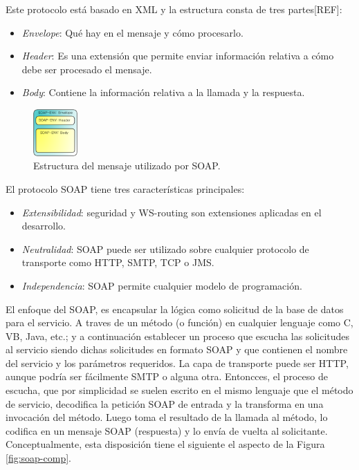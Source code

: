 \documentclass[conference]{IEEEtran}
\begin{document}
Este protocolo está basado en XML y la estructura consta de tres
partes[REF]:
\begin{itemize}
\item\emph{Envelope}: Qué hay en el mensaje y cómo procesarlo.
\item\emph{Header}: Es una extensión que permite enviar información
  relativa a cómo debe ser procesado el mensaje.
\item\emph{Body}: Contiene la información relativa a la llamada y la
  respuesta.
\end{itemize}

\begin{figure}[!t]
\centering
  \includegraphics[width=0.15\textwidth]{img/soap}
  \caption{Estructura del mensaje utilizado por SOAP.}
  \label{fig:soap-env}
\end{figure}

El protocolo SOAP tiene tres características principales:
\begin{itemize}
\item\emph{Extensibilidad}: seguridad y WS-routing son extensiones aplicadas
  en el desarrollo.
\item\emph{Neutralidad}: SOAP puede ser utilizado sobre cualquier protocolo
  de transporte como HTTP, SMTP, TCP o JMS.
\item\emph{Independencia}: SOAP permite cualquier modelo de programación.
\end{itemize}

El enfoque del SOAP, es encapsular la lógica como solicitud de la base
de datos para el servicio. A traves de un método (o función) en
cualquier lenguaje como C, VB, Java, etc.; y a continuación establecer
un proceso que escucha las
solicitudes al servicio siendo dichas solicitudes en formato SOAP y
que contienen el nombre del servicio y los parámetros requeridos. La
capa de transporte puede ser HTTP, aunque podría ser fácilmente SMTP o
alguna otra. Entoncces, el proceso de escucha, que por simplicidad se
suelen escrito en el mismo lenguaje que el método de servicio,
decodifica la petición SOAP de entrada y la transforma en una
invocación del método.
Luego toma el resultado de la llamada al método, lo codifica en un
mensaje SOAP (respuesta) y lo envía de vuelta al
solicitante. Conceptualmente, esta disposición tiene el siguiente
el aspecto  de la Figura \ref{fig:soap-comp}.
\end{document}
